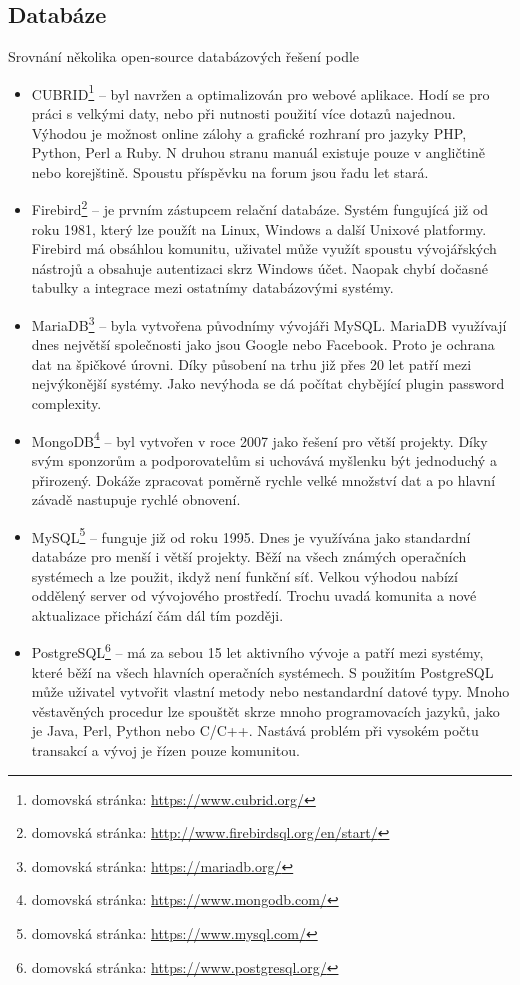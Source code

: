         \subsection{Databáze}
            Srovnání několika open-source databázových řešení podle \cite{database}\\
            \begin{itemize}
                \item CUBRID\footnote{domovská stránka: \url{https://www.cubrid.org/}} – byl navržen a optimalizován pro webové aplikace. Hodí se pro práci s velkými daty, nebo při nutnosti použití více dotazů najednou. Výhodou je možnost online zálohy a grafické rozhraní pro jazyky PHP, Python, Perl a Ruby. N druhou stranu manuál existuje pouze v angličtině nebo korejštině. Spoustu příspěvku na forum jsou řadu let stará.
                \item Firebird\footnote{domovská stránka: \url{http://www.firebirdsql.org/en/start/}} – je prvním zástupcem relační databáze. Systém fungujícá již od roku 1981, který lze použít na Linux, Windows a další Unixové platformy. Firebird má obsáhlou komunitu, uživatel může využít spoustu vývojářských nástrojů a obsahuje autentizaci skrz Windows účet. Naopak chybí dočasné tabulky a integrace mezi ostatnímy databázovými systémy.
                \item MariaDB\footnote{domovská stránka: \url{https://mariadb.org/}} – byla vytvořena původnímy vývojáři MySQL. MariaDB využívají dnes největší společnosti jako jsou Google nebo Facebook. Proto je ochrana dat na špičkové úrovni. Díky působení na trhu již přes 20 let patří mezi nejvýkonější systémy. Jako nevýhoda se dá počítat chybějící plugin password complexity.
                \item MongoDB\footnote{domovská stránka: \url{https://www.mongodb.com/}} – byl vytvořen v roce 2007 jako řešení pro větší projekty. Díky svým sponzorům a podporovatelům si uchovává myšlenku být jednoduchý a přirozený. Dokáže zpracovat poměrně rychle velké množství dat a po hlavní závadě nastupuje rychlé obnovení.
                \item MySQL\footnote{domovská stránka: \url{https://www.mysql.com/}} – funguje již od roku 1995. Dnes je využívána jako standardní databáze pro menší i větší projekty. Běží na všech známých operačních systémech a lze použit, ikdyž není funkční síť. Velkou výhodou nabízí oddělený server od vývojového prostředí. Trochu uvadá komunita a nové aktualizace přichází čám dál tím později. 
                \item PostgreSQL\footnote{domovská stránka: \url{https://www.postgresql.org/}} – má za sebou 15 let aktivního vývoje a patří mezi systémy, které běží na všech hlavních operačních systémech. S použitím PostgreSQL může uživatel vytvořit vlastní metody nebo nestandardní datové typy. Mnoho věstavěných procedur lze spouštět skrze mnoho programovacích jazyků, jako je Java, Perl, Python nebo C/C++. Nastává problém při vysokém počtu transakcí a vývoj je řízen pouze komunitou.

\end{itemize}
